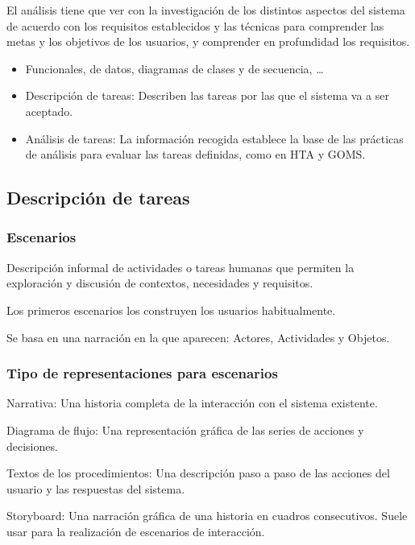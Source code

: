 \documentclass[12pt, twoside, openright]{report} %
\begin{document}
    El análisis tiene que ver con la investigación de los distintos
    aspectos del sistema de acuerdo con los requisitos establecidos y
    las técnicas para comprender las metas y los objetivos de los
    usuarios, y comprender en profundidad los requisitos.

    \begin{itemize}
    
    \item
      Funcionales, de datos, diagramas de clases y de secuencia,
      \ldots{}
    \item
      Descripción de tareas: Describen las tareas por las que el sistema
      va a ser aceptado.
    \item
      Análisis de tareas: La información recogida establece la base de
      las prácticas de análisis para evaluar las tareas definidas, como
      en HTA y GOMS.
    \end{itemize}

\subsection{Descripción de tareas}

\subsubsection{Escenarios}

      Descripción informal de actividades o tareas humanas que permiten
      la exploración y discusión de contextos, necesidades y requisitos.

      Los primeros escenarios los construyen los usuarios habitualmente.

      Se basa en una narración en la que aparecen: Actores, Actividades
      y Objetos.
 
\subsubsection{Tipo de representaciones para escenarios}


      Narrativa: Una historia completa de la interacción con el sistema
      existente.

      Diagrama de flujo: Una representación gráfica de las series de
      acciones y decisiones.

      Textos de los procedimientos: Una descripción paso a paso de las
      acciones del usuario y las respuestas del sistema.

      Storyboard: Una narración gráfica de una historia en cuadros
      consecutivos. Suele usar para la realización de escenarios de
      interacción.
\end{document}
